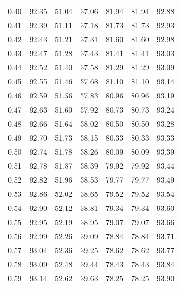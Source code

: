 \begin{tabular}{|c|c|c|c|c|c|c|}
      0.40 &     92.35 &     51.04 &      37.06 &   81.94 &      81.94 &         92.88 \\
      0.41 &     92.39 &     51.11 &      37.18 &   81.73 &      81.73 &         92.93 \\
      0.42 &     92.43 &     51.21 &      37.31 &   81.60 &      81.60 &         92.98 \\
      0.43 &     92.47 &     51.28 &      37.43 &   81.41 &      81.41 &         93.03 \\
      0.44 &     92.52 &     51.40 &      37.58 &   81.29 &      81.29 &         93.09 \\
      0.45 &     92.55 &     51.46 &      37.68 &   81.10 &      81.10 &         93.14 \\
      0.46 &     92.59 &     51.56 &      37.83 &   80.96 &      80.96 &         93.19 \\
      0.47 &     92.63 &     51.60 &      37.92 &   80.73 &      80.73 &         93.24 \\
      0.48 &     92.66 &     51.64 &      38.02 &   80.50 &      80.50 &         93.28 \\
      0.49 &     92.70 &     51.73 &      38.15 &   80.33 &      80.33 &         93.33 \\
      0.50 &     92.74 &     51.78 &      38.26 &   80.09 &      80.09 &         93.39 \\
      0.51 &     92.78 &     51.87 &      38.39 &   79.92 &      79.92 &         93.44 \\
      0.52 &     92.82 &     51.96 &      38.53 &   79.77 &      79.77 &         93.49 \\
      0.53 &     92.86 &     52.02 &      38.65 &   79.52 &      79.52 &         93.54 \\
      0.54 &     92.90 &     52.12 &      38.81 &   79.34 &      79.34 &         93.60 \\
      0.55 &     92.95 &     52.19 &      38.95 &   79.07 &      79.07 &         93.66 \\
      0.56 &     92.99 &     52.26 &      39.09 &   78.84 &      78.84 &         93.71 \\
      0.57 &     93.04 &     52.36 &      39.25 &   78.62 &      78.62 &         93.77 \\
      0.58 &     93.09 &     52.48 &      39.44 &   78.43 &      78.43 &         93.84 \\
      0.59 &     93.14 &     52.62 &      39.63 &   78.25 &      78.25 &         93.90 \\

\end{tabular}
